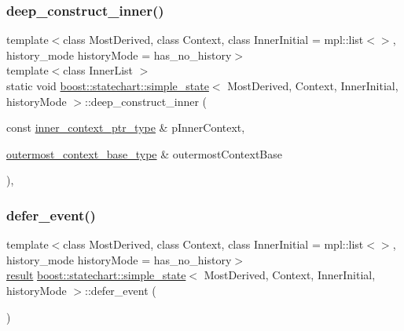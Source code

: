 \subsubsection{\texorpdfstring{deep\+\_\+construct\+\_\+inner()}{deep\_construct\_inner()}}
{\footnotesize\ttfamily template$<$class Most\+Derived, class Context, class Inner\+Initial = mpl\+::list$<$$>$, history\+\_\+mode history\+Mode = has\+\_\+no\+\_\+history$>$ \\
template$<$class Inner\+List $>$ \\
static void \mbox{\hyperlink{classboost_1_1statechart_1_1simple__state}{boost\+::statechart\+::simple\+\_\+state}}$<$ Most\+Derived, Context, Inner\+Initial, history\+Mode $>$\+::deep\+\_\+construct\+\_\+inner (\begin{DoxyParamCaption}\item[{const \mbox{\hyperlink{classboost_1_1statechart_1_1simple__state_ad6d3233a11a23e91b4cc9edcae799379}{inner\+\_\+context\+\_\+ptr\+\_\+type}} \&}]{p\+Inner\+Context,  }\item[{\mbox{\hyperlink{classboost_1_1statechart_1_1simple__state_a50f21d7a7d6632eb34430e74cbad3197}{outermost\+\_\+context\+\_\+base\+\_\+type}} \&}]{outermost\+Context\+Base }\end{DoxyParamCaption})\hspace{0.3cm}{\ttfamily [inline]}, {\ttfamily [static]}}

\mbox{\label{classboost_1_1statechart_1_1simple__state_aa2d6f620620d43f7db68baa9ed638b80}} 
\subsubsection{\texorpdfstring{defer\+\_\+event()}{defer\_event()}}
{\footnotesize\ttfamily template$<$class Most\+Derived, class Context, class Inner\+Initial = mpl\+::list$<$$>$, history\+\_\+mode history\+Mode = has\+\_\+no\+\_\+history$>$ \\
\mbox{\hyperlink{namespaceboost_1_1statechart_abe807f6598b614d6d87bb951ecd92331}{result}} \mbox{\hyperlink{classboost_1_1statechart_1_1simple__state}{boost\+::statechart\+::simple\+\_\+state}}$<$ Most\+Derived, Context, Inner\+Initial, history\+Mode $>$\+::defer\+\_\+event (\begin{DoxyParamCaption}{ }\end{DoxyParamCaption})\hspace{0.3cm}{\ttfamily [inline]}}

